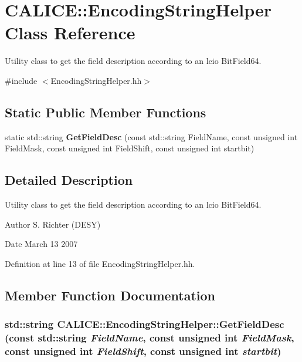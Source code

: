 \section{CALICE::EncodingStringHelper Class Reference}
\label{classCALICE_1_1EncodingStringHelper}


Utility class to get the field description according to an lcio BitField64.  


{\ttfamily \#include $<$EncodingStringHelper.hh$>$}\subsection*{Static Public Member Functions}
\begin{DoxyCompactItemize}
\item 
static std::string {\bf GetFieldDesc} (const std::string FieldName, const unsigned int FieldMask, const unsigned int FieldShift, const unsigned int startbit)
\end{DoxyCompactItemize}


\subsection{Detailed Description}
Utility class to get the field description according to an lcio BitField64. \begin{DoxyAuthor}{Author}
S. Richter (DESY) 
\end{DoxyAuthor}
\begin{DoxyDate}{Date}
March 13 2007 
\end{DoxyDate}


Definition at line 13 of file EncodingStringHelper.hh.

\subsection{Member Function Documentation}
\subsubsection[{GetFieldDesc}]{\setlength{\rightskip}{0pt plus 5cm}std::string CALICE::EncodingStringHelper::GetFieldDesc (const std::string {\em FieldName}, \/  const unsigned int {\em FieldMask}, \/  const unsigned int {\em FieldShift}, \/  const unsigned int {\em startbit})\hspace{0.3cm}{\ttfamily  [static]}}\label{classCALICE_1_1EncodingStringHelper_acf70b62844698b1cc0fb9e04531d5ba4}

